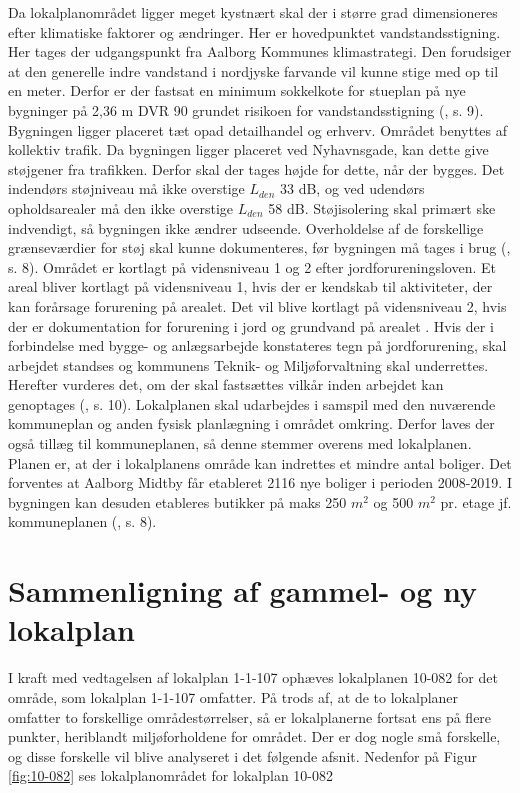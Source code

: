 Da lokalplanområdet ligger meget kystnært skal der i større grad dimensioneres efter klimatiske faktorer og ændringer. Her er hovedpunktet vandstandsstigning. Her tages der udgangspunkt fra Aalborg Kommunes klimastrategi. Den forudsiger at den generelle indre vandstand i nordjyske farvande vil kunne stige med op til en meter. Derfor er der fastsat en minimum sokkelkote for stueplan på nye bygninger på 2,36 m DVR 90 grundet risikoen for vandstandsstigning (\citep{lokalplan}, s. 9).
\newline \indent{     }  Bygningen ligger placeret tæt opad detailhandel og erhverv. Området benyttes af kollektiv trafik. Da bygningen ligger placeret ved Nyhavnsgade, kan dette give støjgener fra trafikken. Derfor skal der tages højde for dette, når der bygges. Det indendørs støjniveau må ikke overstige $L_{den}$ 33 dB, og ved udendørs opholdsarealer må den ikke overstige $L_{den}$ 58 dB. Støjisolering skal primært ske indvendigt, så bygningen ikke ændrer udseende. Overholdelse af de forskellige grænseværdier for støj skal kunne dokumenteres, før bygningen må tages i brug (\citep{lokalplan}, s. 8).
Området er kortlagt på vidensniveau 1 og 2 efter jordforureningsloven. Et areal bliver kortlagt på vidensniveau 1, hvis der er kendskab til aktiviteter, der kan forårsage forurening på arealet. Det vil blive kortlagt på vidensniveau 2, hvis der er dokumentation for forurening i jord og grundvand på arealet \citep{vidensniveau}. Hvis der i forbindelse med bygge- og anlægsarbejde konstateres tegn på jordforurening, skal arbejdet standses og kommunens Teknik- og Miljøforvaltning skal underrettes. Herefter vurderes det, om der skal fastsættes vilkår inden arbejdet kan genoptages (\citep{lokalplan}, s. 10).
\newline
\newline
Lokalplanen skal udarbejdes i samspil med den nuværende kommuneplan og anden fysisk planlægning i området omkring. Derfor laves der også tillæg til kommuneplanen, så denne stemmer overens med lokalplanen. Planen er, at der i lokalplanens område kan indrettes et mindre antal boliger. Det forventes at Aalborg Midtby får etableret 2116 nye boliger i perioden 2008-2019. I bygningen kan desuden etableres butikker på maks 250 $m^2$  og 500 $m^2$ pr. etage jf. kommuneplanen (\citep{lokalplan}, s. 8).

\section{Sammenligning af gammel- og ny lokalplan}
I kraft med vedtagelsen af lokalplan 1-1-107 ophæves lokalplanen 10-082 for det område, som lokalplan 1-1-107 omfatter. På trods af, at de to lokalplaner omfatter to forskellige områdestørrelser, så er lokalplanerne fortsat ens på flere punkter, heriblandt miljøforholdene for området. Der er dog nogle små forskelle, og disse forskelle vil blive analyseret i det følgende afsnit. Nedenfor på Figur \ref{fig:10-082} ses lokalplanområdet for lokalplan 10-082

